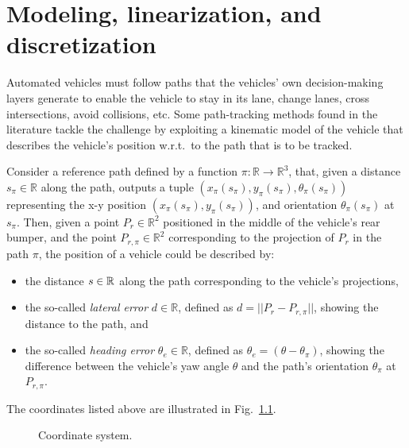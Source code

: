 \chapter{Modeling, linearization, and discretization}
\label{ch:modeling}
	Automated vehicles must follow paths that the vehicles' own decision-making layers generate to enable the vehicle to stay in its lane, change lanes, cross intersections, avoid collisions, etc. 
	Some path-tracking methods found in the literature tackle the challenge by exploiting a kinematic model of the vehicle that describes the vehicle's position w.r.t.\ to the path that is to be tracked.

	Consider a reference path defined by a function %
	$\pi : \mathbb{R}\to\mathbb{R}^3$, %
	that, given a distance %
	$s_\pi\in\mathbb{R}$ %
	along the path, outputs a tuple %
	$(x_\pi(s_\pi), y_\pi(s_\pi), \theta_\pi(s_\pi))$ %
	representing the x-y position %
	$(x_\pi(s_\pi), y_\pi(s_\pi))$, %
	and orientation %
	$\theta_\pi(s_\pi)$ %
	at %
	$s_\pi$. %
	Then, given a point %
	$P_r\in\mathbb{R}^2$ %
	positioned in the middle of the vehicle's rear bumper, and the point %
	$P_{r,\pi}\in\mathbb{R}^2$ %
	corresponding to the projection of %
	$P_r$ %
	in the path %
	$\pi$, %
	the position of a vehicle could be described by:
	\begin{itemize}
		\item the distance %
		$s\in\mathbb{R}$ %
		along the path corresponding to the vehicle's projections, 
		\item the so-called \emph{lateral error} %
		$d\in\mathbb{R}$, %
		defined as %
		$d = ||P_r - P_{r,\pi}||$, %
		showing the distance to the path, and
		\item the so-called \emph{heading error} %
		$\theta_e \in \mathbb{R}$, %
		defined as %
		$\theta_e = (\theta - \theta_\pi)$, %
		showing the difference between the vehicle's yaw angle $\theta$ and the path's orientation %
		$\theta_\pi$ at $P_{r,\pi}$. 
		\end{itemize}
		The coordinates listed above are illustrated in Fig.\ \ref{fig:system}.

	\begin{figure}[!h]
		\centering
		\caption{Coordinate system.}
		\label{fig:system}
	\end{figure}	
	
